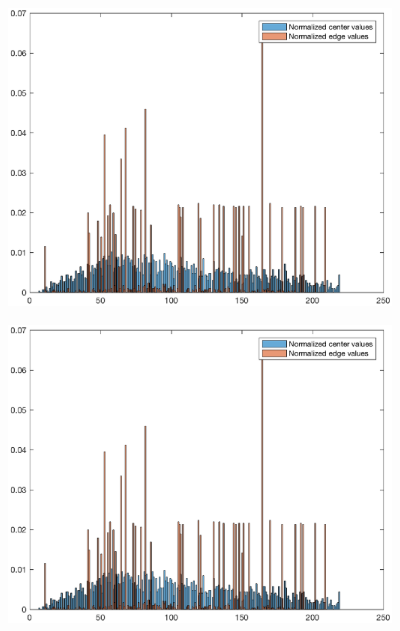 \documentclass{article}
\begin{document}
\includegraphics [width=4in]{lab4_02.eps}

\includegraphics [width=4in]{lab4_03.eps}
\end{document}
